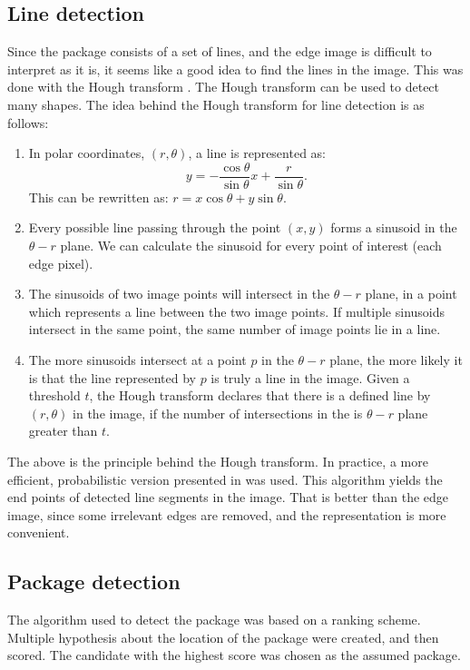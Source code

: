\subsection{Line detection} \label{method:line_detection}%
Since the package consists of a set of lines, and the edge image is difficult to interpret as it is, it seems like a good idea to find the lines in the image.
This was done with the Hough transform \cite{illingworth1988survey}.
The Hough transform can be used to detect many shapes.
The idea behind the Hough transform for line detection is as follows:
\begin{enumerate}
	\item In polar coordinates, $(r, \theta)$, a line is represented as: $$y = -\frac{\cos \theta}{\sin \theta} x + \frac{r}{\sin \theta}.$$ This can be rewritten as: $r = x \cos \theta + y \sin \theta$. 
	\item Every possible line passing through the point $(x,y)$ forms a sinusoid in the $\theta - r$ plane. We can calculate the sinusoid for every point of interest (each edge pixel).
	\item The sinusoids of two image points will intersect in the $\theta - r$ plane, in a point which represents a line between the two image points. If multiple sinusoids intersect in the same point, the same number of image points lie in a line.
	\item The more sinusoids intersect at a point $p$ in the $\theta - r$ plane, the more likely it is that the line represented by $p$ is truly a line in the image. Given a threshold $t$, the Hough transform declares that there is a defined line by $(r, \theta)$ in the image, if the number of intersections in the is $\theta - r$ plane greater than $t$.
\end{enumerate}
The above is the principle behind the Hough transform.
In practice, a more efficient, probabilistic version presented in \cite{houghp} was used. 
This algorithm yields the end points of detected line segments in the image.
That is better than the edge image, since some irrelevant edges are removed, and the representation is more convenient.

\subsection{Package detection} \label{method:package_detection}
The algorithm used to detect the package was based on a ranking scheme.
Multiple hypothesis about the location of the package were created, and then scored. 
The candidate with the highest score was chosen as the assumed package. 

